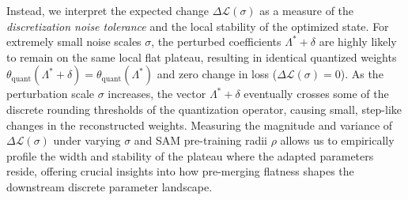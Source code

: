 Instead, we interpret the expected change $\Delta \mathcal{L}(\sigma)$ as a measure of the \emph{discretization noise tolerance} and the local stability of the optimized state. For extremely small noise scales $\sigma$, the perturbed coefficients $\Lambda^* + \delta$ are highly likely to remain on the same local flat plateau, resulting in identical quantized weights $\theta_{\text{quant}}(\Lambda^* + \delta) = \theta_{\text{quant}}(\Lambda^*)$ and zero change in loss ($\Delta \mathcal{L}(\sigma) = 0$). As the perturbation scale $\sigma$ increases, the vector $\Lambda^* + \delta$ eventually crosses some of the discrete rounding thresholds of the quantization operator, causing small, step-like changes in the reconstructed weights. Measuring the magnitude and variance of $\Delta \mathcal{L}(\sigma)$ under varying $\sigma$ and SAM pre-training radii $\rho$ allows us to empirically profile the width and stability of the plateau where the adapted parameters reside, offering crucial insights into how pre-merging flatness shapes the downstream discrete parameter landscape.
